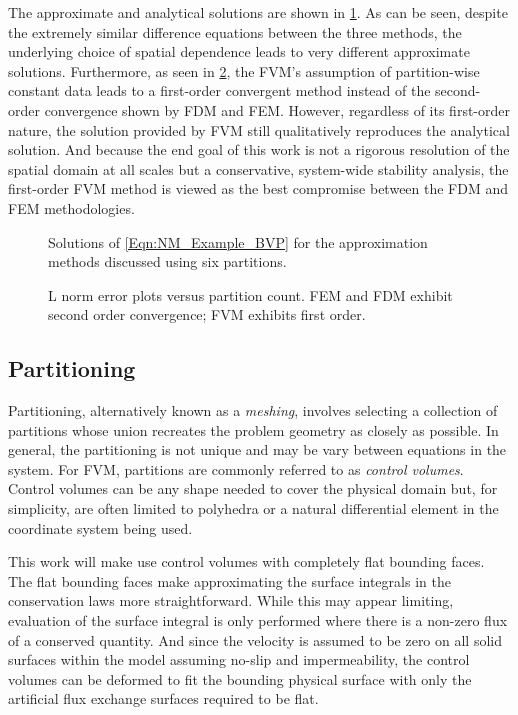 \documentclass[12pt]{../UWMadThesis}
\begin{document}
The approximate and analytical solutions are shown in \cref{Fig:NM_Example_ApproximationComparison}.
As can be seen, despite the extremely similar difference equations between the three methods, the underlying choice of spatial dependence leads to very different approximate solutions.
Furthermore, as seen in \cref{Fig:NM_Example_ApproximationComparisonError}, the FVM's assumption of partition-wise constant data leads to a first-order convergent method instead of the second-order convergence shown by FDM and FEM.
However, regardless of its first-order nature, the solution provided by FVM still qualitatively reproduces the analytical solution.
And because the end goal of this work is not a rigorous resolution of the spatial domain at all scales but a conservative, system-wide stability analysis, the first-order FVM method is viewed as the best compromise between the FDM and FEM methodologies.


\begin{figure}%
    \centering
    \caption{Solutions of \cref{Eqn:NM_Example_BVP} for the approximation methods discussed using six partitions.}
    \label{Fig:NM_Example_ApproximationComparison}
\end{figure}
\begin{figure}%
    \centering
    \caption{L norm error plots versus partition count. FEM and FDM exhibit second order convergence; FVM exhibits first order.}%
    \label{Fig:NM_Example_ApproximationComparisonError}
\end{figure}


\subsection{Partitioning}

Partitioning, alternatively known as a \textit{meshing}, involves selecting a collection of partitions whose union recreates the problem geometry as closely as possible.
In general, the partitioning is not unique and may be vary between equations in the system.
For FVM, partitions are commonly referred to as \textit{control volumes}.
Control volumes can be any shape needed to cover the physical domain but, for simplicity, are often limited to polyhedra or a natural differential element in the coordinate system being used.

This work will make use control volumes with completely flat bounding faces.
The flat bounding faces make approximating the surface integrals in the conservation laws more straightforward.
While this may appear limiting, evaluation of the surface integral is only performed where there is a non-zero flux of a conserved quantity.
And since the velocity is assumed to be zero on all solid surfaces within the model assuming no-slip and impermeability, the control volumes can be deformed to fit the bounding physical surface with only the artificial flux exchange surfaces required to be flat.
\end{document}
